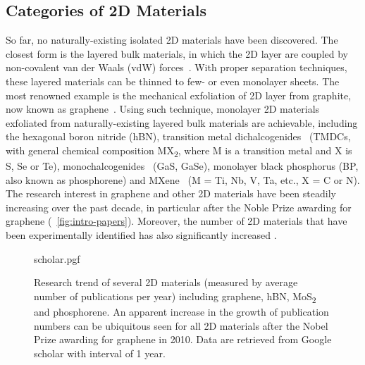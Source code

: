 

\subsection{Categories of 2D Materials}
\label{sec:categ-2d-mater}

So far, no naturally-existing isolated 2D
materials have been discovered.
%
The closest form is the layered bulk materials, in which the 2D layer
are coupled by non-covalent van der Waals (vdW)
forces~\autocite{Israelachvili_2011_book}.
%
With proper separation techniques, these layered materials can be
thinned to few- or even mono\-layer sheets.
%
The most renowned example is the mechanical exfoliation of 2D layer from graphite,
now known as graphene~\autocite{Novoselov_2004_gr}.
%
Using such technique, mono\-layer 2D materials exfoliated from naturally-existing
layered bulk materials are achievable, including the hexagonal boron
nitride\autocite{Cavar_2008_hBN_Pt,Gorbachev_2011_BN_monolayer} (hBN), transition metal
dichalcogenides~\autocite{Mak_2010_mos2} (TMDCs, with general chemical
composition MX\textsubscript{2}, where M is a transition metal and X
is S, Se or Te), monochalcogenides~\autocite{Late_2012_GaS} (GaS, GaSe),
monolayer black phosphorus\autocite{Li_2014_BP,Liu_2014_BP} (BP, also
known as phosphorene) and MXene~\autocite{Naguib_2011_Mxene} (M = Ti, Nb,
V, Ta, etc., X = C or N).
%
The research interest in graphene and other 2D materials have been
steadily increasing over the past decade, in particular after the
Noble Prize awarding for graphene (~\autoref{fig:intro-papers}).
%
Moreover, the number of 2D materials that have been experimentally
identified has also significantly increased
\autocite{Bhimanapati_2015_2D_rev,Mannix_2017}.

\begin{figure}[!htbp]
  \centering
  {scholar.pgf}
  \caption{\label{fig:intro-papers} %
    Research trend of several 2D materials (measured by average number
    of publications per year) including graphene, hBN,
    MoS\textsubscript{2} and phosphorene.  An apparent increase in the
    growth of publication numbers can be ubiquitous seen for all 2D
    materials after the Nobel Prize awarding for graphene in 2010.
    Data are retrieved from Google scholar with interval of 1
    year. }
\end{figure}

